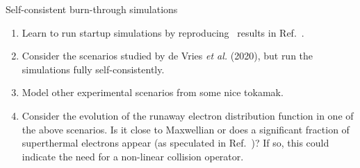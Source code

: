 \documentclass{notes}
\begin{document}
    \begin{taskbox}{Self-consistent burn-through simulations}
        \begin{enumerate}
            \item Learn to run startup simulations by reproducing \DYON\ results
            in Ref.~\cite{Kim2012}.
            \item Consider the scenarios studied by de Vries {\em et al.} (2020), but run
            the simulations fully self-consistently.
            \item Model other experimental scenarios from some nice tokamak.
            \item Consider the evolution of the runaway electron distribution
            function in one of the above scenarios. Is it close to Maxwellian
            or does a significant fraction of superthermal electrons appear
            (as speculated in Ref.~\cite{deVries2019})? If so, this could
            indicate the need for a non-linear collision operator.
        \end{enumerate}
    \end{taskbox}

    \printbibliography

    \newpage
    \appendix
\end{document}
